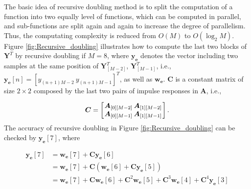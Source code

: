 The basic idea of recursive doubling method is to split the computation of a function into two equally level of functions,
which can be computed in parallel, and sub-functions are split again and again to increase the degree of parallelism.
Thus, the computating complexity is reduced from $O(M)$ to $O(\log_2M)$.
Figure \ref{fig:Recursive_doubling} illustrates how to compute the last two blocks of $\bm{Y}^T$ by 
recursive doubling if $M=8$, where $\bm{y_e}$ denotes the vector including two samples at the same position 
of $\bm{Y}^T_{[M-2]}$, $\bm{Y}^T_{[M-1]}$,
i.e., $\bm{y_e}[n] = \left[y_{(n+1)M-2} ~ y_{(n+1)M-1}\right]^T$, as well as $\bm{w_e}$.
$\bm{C}$ is a constant matrix
of size $2 \times 2$ composed by the last two pairs of impulse responses in $\bm{A}$, i.e.,

\begin{equation*}
    \bm{C} = \left[\arraycolsep=1.0pt\def\arraystretch{1.0}
        \begin{array}{cc}
        \bm{A}_{[0][M-2]} & \bm{A}_{[1][M-2]} \\ 
        \bm{A}_{[0][M-1]} & \bm{A}_{[1][M-1]} \\ 
        \end{array}\right].
\end{equation*}
The accuracy of recursive doubling in Figure \ref{fig:Recursive_doubling} can be checked by
$\bm{y_e}[7]$, where

\begin{equation}
    \begin{aligned}
        \bm{y_e}[7] &= \bm{w_e}[7] + \bm{C}\bm{y_e}[6] \\
        &= \bm{w_e}[7] + \bm{C}(\bm{w_e}[6] + \bm{C}\bm{y_e}[5]) \\
        &= \bm{w_e}[7] + \bm{C}\bm{w_e}[6] + \bm{C}^2\bm{w_e}[5] + \bm{C}^3\bm{w_e}[4] + \bm{C}^4\bm{y_e}[3]
    \end{aligned}
\end{equation}

